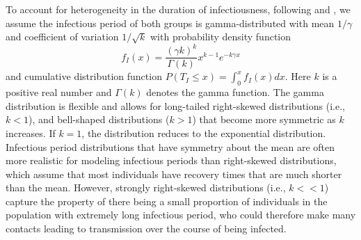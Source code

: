 \documentclass{imammb}
\numberwithin{equation}{section}
\begin{document}
To account for heterogeneity in the duration of infectiousness, following \citet{Anderson1980-vq} and  \citet{Britton2009-tt}, we assume the infectious period of both groups is gamma-distributed with mean $1/\gamma$ and coefficient of variation $1/\sqrt{k}$ with probability density function
\begin{equation}\label{eqn:gammapdf}
f_I(x) = \frac{(\gamma k)^k}{\Gamma(k)} x^{k-1}e^{-k \gamma x}
\end{equation}
and cumulative distribution function $P(T_I \leq x) = \int_0^x f_I(x) dx$. Here $k$ is a positive real number and $\Gamma(k)$ denotes the gamma function. The gamma distribution is flexible and allows for long-tailed right-skewed distributions (i.e., $k<1$), and bell-shaped distributions ($k>1$) that become more symmetric as $k$ increases. If $k=1$, the distribution reduces to the exponential distribution. Infectious period distributions that have symmetry about the mean are often more realistic for modeling infectious periods \citep{Lloyd2001-eq, Wearing2005-oo, Keeling2008-sh} than right-skewed distributions, which assume that most individuals have recovery times that are much shorter than the mean. However, strongly right-skewed distributions (i.e., $k<<1$) capture the property of there being a small proportion of individuals in the population with extremely long infectious period, who could therefore make many contacts leading to transmission over the course of being infected.
\end{document}
